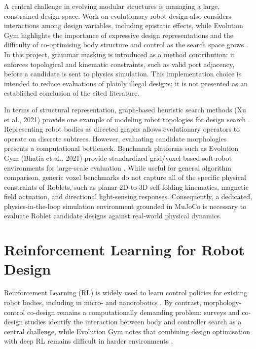 \documentclass[12pt,a4paper]{report}
\begin{document}
A central challenge in evolving modular structures is managing a large, constrained design space. Work on evolutionary robot design also considers interactions among design variables, including epistatic effects, while Evolution Gym highlights the importance of expressive design representations and the difficulty of co-optimising body structure and control as the search space grows \citep{miras2026epistatic,bhatia2021evolution}. In this project, grammar masking is introduced as a method contribution: it enforces topological and kinematic constraints, such as valid port adjacency, before a candidate is sent to physics simulation. This implementation choice is intended to reduce evaluations of plainly illegal designs; it is not presented as an established conclusion of the cited literature.

In terms of structural representation, graph-based heuristic search methods (Xu et al., 2021) provide one example of modeling robot topologies for design search \citep{xu2021multi}. Representing robot bodies as directed graphs allows evolutionary operators to operate on discrete subtrees. However, evaluating candidate morphologies presents a computational bottleneck. Benchmark platforms such as Evolution Gym (Bhatia et al., 2021) provide standardized grid/voxel-based soft-robot environments for large-scale evaluation \citep{bhatia2021evolution}. While useful for general algorithm comparison, generic voxel benchmarks do not capture all of the specific physical constraints of Roblets, such as planar 2D-to-3D self-folding kinematics, magnetic field actuation, and directional light-sensing responses. Consequently, a dedicated, physics-in-the-loop simulation environment grounded in MuJoCo is necessary to evaluate Roblet candidate designs against real-world physical dynamics.

\section{Reinforcement Learning for Robot Design}
Reinforcement Learning (RL) is widely used to learn control policies for existing robot bodies, including in micro- and nanorobotics \citep{yang2024machine}. By contrast, morphology-control co-design remains a computationally demanding problem: surveys and co-design studies identify the interaction between body and controller search as a central challenge, while Evolution Gym notes that combining design optimisation with deep RL remains difficult in harder environments \citep{li2023modular,sun2023co,bhatia2021evolution}.
\end{document}
